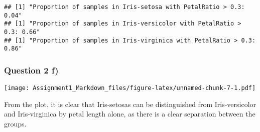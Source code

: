 \documentclass[
]{article}
\newenvironment{Shaded}{\begin{snugshade}}{\end{snugshade}}
\newcommand{\AttributeTok}[1]{\textcolor[rgb]{0.77,0.63,0.00}{#1}}
\newcommand{\CommentTok}[1]{\textcolor[rgb]{0.56,0.35,0.01}{\textit{#1}}}
\newcommand{\DecValTok}[1]{\textcolor[rgb]{0.00,0.00,0.81}{#1}}
\newcommand{\FloatTok}[1]{\textcolor[rgb]{0.00,0.00,0.81}{#1}}
\newcommand{\FunctionTok}[1]{\textcolor[rgb]{0.00,0.00,0.00}{#1}}
\newcommand{\NormalTok}[1]{#1}
\newcommand{\OtherTok}[1]{\textcolor[rgb]{0.56,0.35,0.01}{#1}}
\newcommand{\SpecialCharTok}[1]{\textcolor[rgb]{0.00,0.00,0.00}{#1}}
\newcommand{\StringTok}[1]{\textcolor[rgb]{0.31,0.60,0.02}{#1}}
\begin{document}
\begin{verbatim}
## [1] "Proportion of samples in Iris-setosa with PetalRatio > 0.3: 0.04"
## [1] "Proportion of samples in Iris-versicolor with PetalRatio > 0.3: 0.66"
## [1] "Proportion of samples in Iris-virginica with PetalRatio > 0.3: 0.86"
\end{verbatim}

\newpage

\hypertarget{question-2-f}{%
\subsubsection{Question 2 f)}\label{question-2-f}}

\begin{Shaded}
\end{Shaded}

\texttt{[image: Assignment1\_Markdown\_files/figure-latex/unnamed-chunk-7-1.pdf]}

From the plot, it is clear that Iris-setosas can be distinguished from
Iris-versicolor and Iris-virginica by petal length alone, as there is a
clear separation between the groups.
\end{document}
